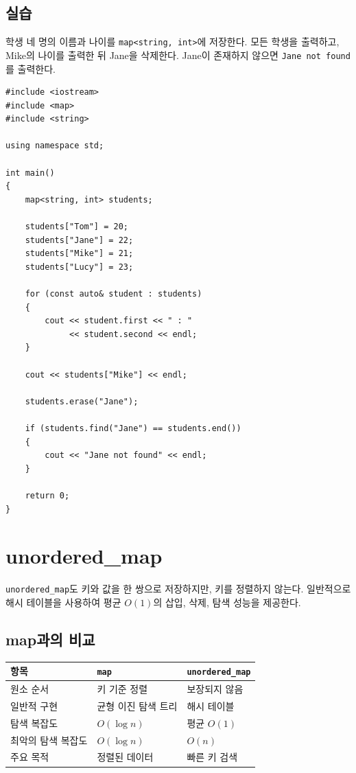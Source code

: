 \documentclass[11pt,a4paper]{article}
\begin{document}
\subsection{실습}
\begin{practicebox}
학생 네 명의 이름과 나이를 \texttt{map<string, int>}에 저장한다. 모든 학생을 출력하고, Mike의 나이를 출력한 뒤 Jane을 삭제한다. Jane이 존재하지 않으면 \texttt{Jane not found}를 출력한다.
\end{practicebox}

\begin{lstlisting}
#include <iostream>
#include <map>
#include <string>

using namespace std;

int main()
{
    map<string, int> students;

    students["Tom"] = 20;
    students["Jane"] = 22;
    students["Mike"] = 21;
    students["Lucy"] = 23;

    for (const auto& student : students)
    {
        cout << student.first << " : "
             << student.second << endl;
    }

    cout << students["Mike"] << endl;

    students.erase("Jane");

    if (students.find("Jane") == students.end())
    {
        cout << "Jane not found" << endl;
    }

    return 0;
}
\end{lstlisting}

\section{unordered\_map}
\texttt{unordered\_map}도 키와 값을 한 쌍으로 저장하지만, 키를 정렬하지 않는다. 일반적으로 해시 테이블을 사용하여 평균 $O(1)$의 삽입, 삭제, 탐색 성능을 제공한다.

\subsection{map과의 비교}
\begin{center}
\begin{tabular}{lll}
\toprule
항목 & \texttt{map} & \texttt{unordered\_map} \\
\midrule
원소 순서 & 키 기준 정렬 & 보장되지 않음 \\
일반적 구현 & 균형 이진 탐색 트리 & 해시 테이블 \\
탐색 복잡도 & $O(\log n)$ & 평균 $O(1)$ \\
최악의 탐색 복잡도 & $O(\log n)$ & $O(n)$ \\
주요 목적 & 정렬된 데이터 & 빠른 키 검색 \\
\bottomrule
\end{tabular}
\end{center}
\end{document}
